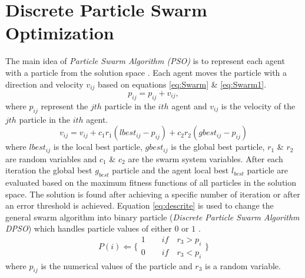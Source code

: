 \documentclass{article}
\begin{document}
\section{Discrete Particle Swarm Optimization}
\label{sec:ParticleSwarmAlgorithm}
The main idea of \textit{Particle Swarm Algorithm (PSO)} is to represent each agent with a particle from the solution space \cite{PSOFirst}. Each agent moves the particle with a direction and velocity $v_{ij}$ based on equations \ref{eq:Swarm} \& \ref{eq:Swarm1}.
\begin{equation}
p_{ij}=p_{ij}+v_{ij},
\label{eq:Swarm1}
\end{equation}
where $p_{ij}$ represent the $jth$ particle in the $ith$ agent and $v_{ij}$ is the velocity of the $jth$ particle in the $ith$ agent.
 \begin{equation}
v_{ij}  = v_{ij}  + c_1 r_1 (lbest_{ij}  - p_{ij} ) + c_2 r_2 (gbest_{ij}  - p_{ij} )
\label{eq:Swarm}
\end{equation}
 where $lbest_{ij}$ is the local best particle, $gbest_{ij}$ is the global best particle, $r_1$ \& $r_2$ are random variables and $c_1$ \& $c_2$ are the swarm system variables.
 After each iteration the global best $g_{best}$ particle and the agent local best $l_{best}$ particle are evaluated based on the maximum fitness functions of all particles in the solution space. The solution is found after achieving a specific number of iteration or after an error threshold is achieved.
Equation \ref{eq:descrite} is used to change the general swarm algorithm into binary particle (\textit{Discrete Particle Swarm Algorithm DPSO}) which handles particle values of either $0$ or $1$ \cite{PSODisceret}.  
\begin{equation}
   P(i)\Leftarrow 
\{
\begin{array}{c} 
1 \quad \quad if\quad r_{3}>p_{i}  \\

0 \quad \quad if\quad r_{3}<p_{i} 
\label{eq:descrite}
\end{array}\}
\end{equation}
 where $p_{ij}$ is the numerical values of the particle and $r_{3}$ is a random variable. 
\end{document}
